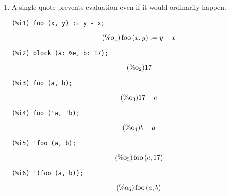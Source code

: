 \documentclass[12pt,leqno]{article}
\begin{document}
\begin{enumerate}
\item A single quote prevents evaluation even if it would ordinarily happen.
\begin{verbatim}
(%i1) foo (x, y) := y - x;
\end{verbatim}
\begin{equation}
\tag{$\mathop{\mathrm{\%o}_{1}}$}\mathop{\mathrm{foo}}\left(x, y\right) := y-x
\label{eq:doc-group1-code16-1-1}
\end{equation}
\begin{verbatim}
(%i2) block (a: %e, b: 17);
\end{verbatim}
\begin{equation}
\tag{$\mathop{\mathrm{\%o}_{2}}$}17
\label{eq:doc-group1-code16-2-1}
\end{equation}
\begin{verbatim}
(%i3) foo (a, b);
\end{verbatim}
\begin{equation}
\tag{$\mathop{\mathrm{\%o}_{3}}$}17-e
\label{eq:doc-group1-code16-3-1}
\end{equation}
\begin{verbatim}
(%i4) foo ('a, 'b);
\end{verbatim}
\begin{equation}
\tag{$\mathop{\mathrm{\%o}_{4}}$}b-a
\label{eq:doc-group1-code16-4-1}
\end{equation}
\begin{verbatim}
(%i5) 'foo (a, b);
\end{verbatim}
\begin{equation}
\tag{$\mathop{\mathrm{\%o}_{5}}$}\mathop{\mathrm{foo}}\left(e, 17\right)
\label{eq:doc-group1-code16-5-1}
\end{equation}
\begin{verbatim}
(%i6) '(foo (a, b));
\end{verbatim}
\begin{equation}
\tag{$\mathop{\mathrm{\%o}_{6}}$}\mathop{\mathrm{foo}}\left(a, b\right)
\label{eq:doc-group1-code16-6-1}
\end{equation}



\end{enumerate}
\end{document}
